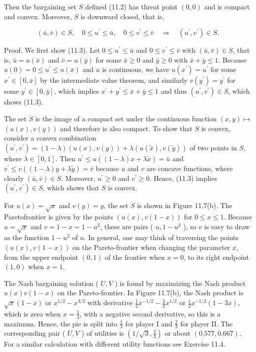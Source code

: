 \documentclass[12pt]{article}
\begin{document}
Then the bargaining set $S$ defined (11.2) has threat point $(0,0)$ and is compact and convex. Moreover, $S$ is downward closed, that is,


\begin{equation*}
(\bar{u}, \bar{v}) \in S, \quad 0 \leq u^{\prime} \leq \bar{u}, \quad 0 \leq v^{\prime} \leq \bar{v} \quad \Rightarrow \quad\left(u^{\prime}, v^{\prime}\right) \in S . \tag{11.3}
\end{equation*}


Proof. We first show (11.3). Let $0 \leq u^{\prime} \leq \bar{u}$ and $0 \leq v^{\prime} \leq \bar{v}$ with $(\bar{u}, \bar{v}) \in S$, that is, $\bar{u}=u(\bar{x})$ and $\bar{v}=u(\bar{y})$ for some $\bar{x} \geq 0$ and $\bar{y} \geq 0$ with $\bar{x}+\bar{y} \leq 1$. Because $u(0)=0 \leq u^{\prime} \leq u(\bar{x})$ and $u$ is continuous, we have $u\left(x^{\prime}\right)=u^{\prime}$ for some $x^{\prime} \in[0, \bar{x}]$ by the intermediate value theorem, and similarly $v\left(y^{\prime}\right)=y^{\prime}$ for some $y^{\prime} \in[0, \bar{y}]$, which implies $x^{\prime}+y^{\prime} \leq \bar{x}+\bar{y} \leq 1$ and thus $\left(u^{\prime}, v^{\prime}\right) \in S$, which shows (11.3).

The set $S$ is the image of a compact set under the continuous function $(x, y) \mapsto$ $(u(x), v(y))$ and therefore is also compact. To show that $S$ is convex, consider a convex combination $\left(u^{\prime}, v^{\prime}\right)=(1-\lambda)(u(x), v(y))+\lambda(u(\tilde{x}), v(\tilde{y}))$ of two points in $S$, where $\lambda \in[0,1]$. Then $u^{\prime} \leq u((1-\lambda) x+\lambda \tilde{x})=\bar{u}$ and $v^{\prime} \leq v((1-\lambda) y+\lambda \tilde{y})=\bar{v}$ because $u$ and $v$ are concave functions, where clearly $(\bar{u}, \bar{v}) \in S$. Moreover, $u^{\prime} \geq 0$ and $v^{\prime} \geq 0$. Hence, (11.3) implies $\left(u^{\prime}, v^{\prime}\right) \in S$, which shows that $S$ is convex.

For $u(x)=\sqrt{x}$ and $v(y)=y$, the set $S$ is shown in Figure 11.7(b). The Paretofrontier is given by the points $(u(x), v(1-x))$ for $0 \leq x \leq 1$. Because $u=\sqrt{x}$ and $v=1-x=1-u^{2}$, these are pairs ( $u, 1-u^{2}$ ), so $v$ is easy to draw as the function $1-u^{2}$ of $u$. In general, one may think of traversing the points $(u(x), v(1-x))$ on the Pareto-frontier when changing the parameter $x$, from the upper endpoint $(0,1)$ of the frontier when $x=0$, to its right endpoint $(1,0)$ when $x=1$.

The Nash bargaining solution ( $U, V$ ) is found by maximizing the Nash product $u(x) v(1-x)$ on the Pareto-frontier. In Figure 11.7(b), the Nash product is $\sqrt{x}(1-x)$ or $x^{1 / 2}-x^{3 / 2}$ with derivative $\frac{1}{2} x^{-1 / 2}-\frac{3}{2} x^{1 / 2}$ or $\frac{1}{2} x^{-1 / 2}(1-3 x)$, which is zero when $x=\frac{1}{3}$, with a negative second derivative, so this is a maximum. Hence, the pie is split into $\frac{1}{3}$ for player I and $\frac{2}{3}$ for player II. The corresponding pair ( $U, V$ ) of utilities is $\left(1 / \sqrt{3}, \frac{2}{3}\right)$ or about $(0.577,0.667)$. For a similar calculation with different utility functions see Exercise 11.4.
\end{document}
